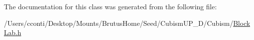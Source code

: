 The documentation for this class was generated from the following file\+:\begin{DoxyCompactItemize}
\item 
/\+Users/cconti/\+Desktop/\+Mounts/\+Brutus\+Home/\+Seed/\+Cubism\+U\+P\+\_\+D/\+Cubism/\hyperlink{_block_lab_8h}{Block\+Lab.\+h}\end{DoxyCompactItemize}
